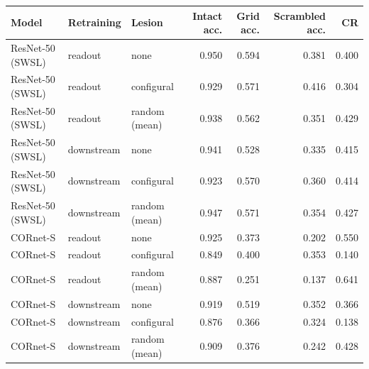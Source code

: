 \begin{tabular}{lllrrrr}
\hline
Model & Retraining & Lesion & Intact acc. & Grid acc. & Scrambled acc. & CR \\
\hline
ResNet-50 (SWSL) & readout & none & 0.950 & 0.594 & 0.381 & 0.400 \\
ResNet-50 (SWSL) & readout & configural & 0.929 & 0.571 & 0.416 & 0.304 \\
ResNet-50 (SWSL) & readout & random (mean) & 0.938 & 0.562 & 0.351 & 0.429 \\
ResNet-50 (SWSL) & downstream & none & 0.941 & 0.528 & 0.335 & 0.415 \\
ResNet-50 (SWSL) & downstream & configural & 0.923 & 0.570 & 0.360 & 0.414 \\
ResNet-50 (SWSL) & downstream & random (mean) & 0.947 & 0.571 & 0.354 & 0.427 \\
CORnet-S & readout & none & 0.925 & 0.373 & 0.202 & 0.550 \\
CORnet-S & readout & configural & 0.849 & 0.400 & 0.353 & 0.140 \\
CORnet-S & readout & random (mean) & 0.887 & 0.251 & 0.137 & 0.641 \\
CORnet-S & downstream & none & 0.919 & 0.519 & 0.352 & 0.366 \\
CORnet-S & downstream & configural & 0.876 & 0.366 & 0.324 & 0.138 \\
CORnet-S & downstream & random (mean) & 0.909 & 0.376 & 0.242 & 0.428 \\
\hline
\end{tabular}
